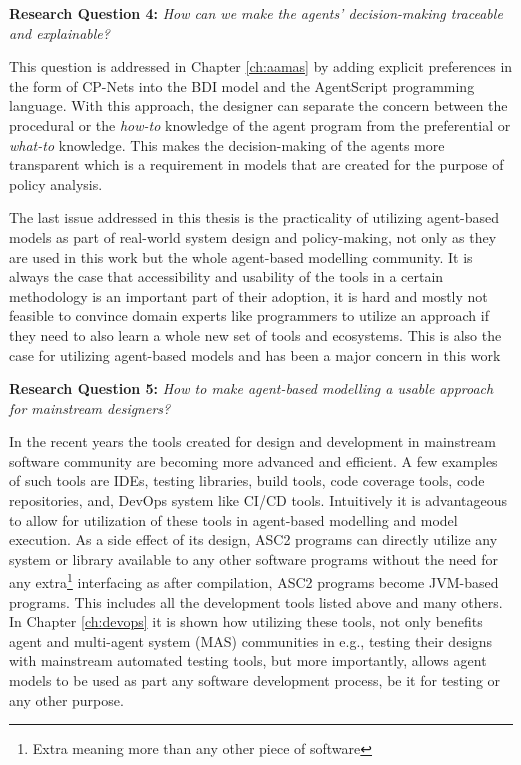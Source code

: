 \begin{displayquote}
\textbf{Research Question 4:} \textit{How can we make the agents' decision-making traceable and explainable?}
\end{displayquote}

This question is addressed in Chapter \ref{ch:aamas} by adding explicit preferences in the form of CP-Nets into the BDI model and the AgentScript programming language. With this approach, the designer can separate the concern between the procedural or the \textit{how-to} knowledge of the agent program from the preferential or \textit{what-to} knowledge. This makes the decision-making of the agents more transparent which is a requirement in models that are created for the purpose of policy analysis. 

The last issue addressed in this thesis is the practicality of utilizing agent-based models as part of real-world system design and policy-making, not only as they are used in this work but the whole agent-based modelling community. It is always the case that accessibility and usability of the tools in a certain methodology is an important part of their adoption, it is hard and mostly not feasible to convince domain experts like programmers to utilize an approach if they need to also learn a whole new set of tools and ecosystems. This is also the case for utilizing agent-based models and has been a major concern in this work

\begin{displayquote}
\textbf{Research Question 5:} \textit{How to make agent-based modelling a usable approach for mainstream designers?}
\end{displayquote}

In the recent years the tools created for design and development in mainstream software community are becoming more advanced and efficient. A few examples of such tools are IDEs, testing libraries, build tools, code coverage tools, code repositories, and, DevOps system like CI/CD tools. Intuitively it is advantageous to allow for utilization of these tools in agent-based modelling and model execution. As a side effect of its design, ASC2 programs can directly utilize any system or library available to any other software programs without the need for any extra\footnote{Extra meaning more than any other piece of software} interfacing as after compilation, ASC2 programs become JVM-based programs. This includes all the development tools listed above and many others. In Chapter \ref{ch:devops} it is shown how utilizing these tools, not only benefits agent and multi-agent system (MAS) communities in e.g., testing their designs with mainstream automated testing tools, but more importantly, allows agent models to be used as part any software development process, be it for testing or any other purpose.


